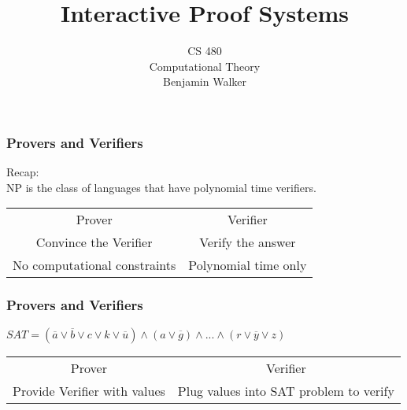 \documentclass{beamer}
\title{Interactive Proof Systems}
\author{CS 480\\[7pt]
    Computational Theory \\[7pt]
    Benjamin Walker}
\date{}
\begin{document}
\begin{frame}[label=title]
\titlepage
\end{frame}

\begin{frame}[label=pca]
\frametitle{Provers and Verifiers}
Recap: \\
NP is the class of languages that have polynomial time verifiers. \\[10pt]
\pause
\begin{center}
\begin{tabular}{ c c }
{\LARGE Prover} & {\LARGE Verifier} \\
Convince the Verifier & Verify the answer \\
\pause
No computational constraints & Polynomial time only \\

\end{tabular}
\end{center}
\end{frame}

\begin{frame}[label=pca]
\frametitle{Provers and Verifiers}
$SAT \equal (\overline{a} \vee \overline{b} \vee c \vee k \vee \overline{u}) \wedge (a \vee \overline{g}) 
\wedge ... \wedge (r \vee \overline{y} \vee z)$
\\[25pt]
\pause
\begin{center}
\begin{tabular}{ c c }
{\LARGE Prover} & {\LARGE Verifier} \\
Provide Verifier with values & Plug values into SAT problem to verify \\

\end{tabular}
\end{center}
\end{frame}
\end{document}
